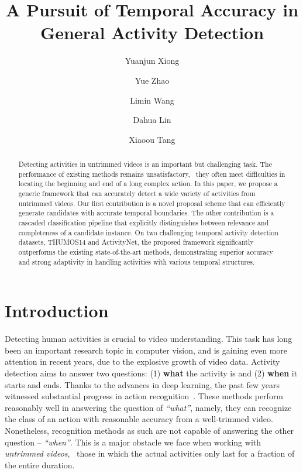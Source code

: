 \documentclass[10pt,twocolumn,letterpaper]{article}
\begin{document}
\title{A Pursuit of Temporal Accuracy in General Activity Detection}

\author[1]{Yuanjun Xiong}
\author[1]{Yue Zhao}
\author[2]{Limin Wang}
\author[1]{Dahua Lin}
\author[1]{Xiaoou Tang}


\maketitle

\begin{abstract}
Detecting activities in untrimmed videos is an important but challenging task. 
The performance of existing methods remains unsatisfactory, 
\eg~they often meet difficulties in locating the beginning and end of a long complex action. 
In this paper, we propose a generic framework that can 
accurately detect a wide variety of activities from untrimmed videos. 
Our first contribution is  a novel proposal scheme that 
can efficiently generate candidates with accurate temporal boundaries.
The other contribution is a cascaded classification pipeline that explicitly distinguishes between relevance and completeness of a candidate instance.  
On two challenging temporal activity detection datasets, THUMOS14 and ActivityNet, 
the proposed framework significantly outperforms the existing state-of-the-art methods, 
demonstrating superior accuracy and strong adaptivity in handling activities with various temporal structures.
\end{abstract}
 

\section{Introduction}
\label{sec:intro}


Detecting human activities is crucial to video understanding.
This task has long been an important research topic in computer vision,
and is gaining even more attention in recent years, due to the explosive growth of video data.
Activity detection aims to answer two questions:
(1) \textbf{what} the activity is and (2) \textbf{when} it starts and ends.
Thanks to the advances in deep learning,
the past few years witnessed substantial progress in 
action recognition~\cite{Simonyan14TwoStream,Tran15C3D,WangQT15TDD,Wang2016TSN}.
These methods perform reasonably well in answering the question of \emph{``what''}, 
namely, they can recognize the class of an action with reasonable accuracy from a well-trimmed video.
Nonetheless, recognition methods as such are not capable of answering the other question -- \emph{``when''}.
This is a major obstacle we face when working with \emph{untrimmed videos},
\ie~those in which the actual activities only last for a fraction of the entire duration.
 
\end{document}
